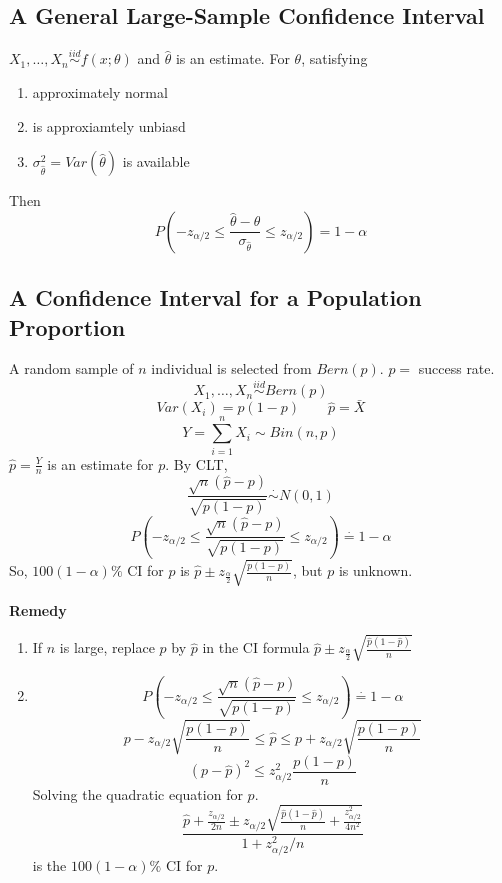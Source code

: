 \subsection{A General Large-Sample Confidence Interval}
$X_1,\dots,X_n \overset{iid}{\sim} f(x;\theta)$ and $\hat{\theta}$ is an estimate.
For $\theta$, satisfying 
\begin{enumerate}
\item approximately normal 
\item is approxiamtely unbiasd
\item $\sigma_{\hat{\theta}}^2=Var(\hat{\theta})$ is available
\end{enumerate}
Then
\[P\left(-z_{\alpha/2} \leq \frac{\hat{\theta}-\theta}{\sigma_{\hat{\theta}}}  \leq  z_{\alpha/2} \right) = 1-\alpha\]

\subsection{A Confidence Interval for a Population Proportion}
\begin{exmp}
A random sample of $n$ individual is selected from $Bern(p)$. $p=$ success rate.
\[X_1,\dots,X_n \overset{iid}{\sim} Bern(p)\]
\[\boxed{Var(X_i)=p(1-p)  \qquad \hat{p}=\bar{X}}\]
\[Y=\sum_{i=1}^n X_i \sim Bin(n,p)\]
$\hat{p}=\frac{Y}{n}$ is an estimate for $p$. By CLT,
\[\frac{\sqrt{n}(\hat{p}-p)}{\sqrt{p(1-p)}} \overset{\cdot}{\sim} N(0,1)\]
\[P\left(-z_{\alpha/2} \leq \frac{\sqrt{n}(\hat{p}-p)}{\sqrt{p(1-p)}}  \leq  z_{\alpha/2} \right) \overset{\cdot}{=} 1-\alpha\]
So, $100(1-\alpha)\%$ CI for $p$ is $\hat{p} \pm  z_{\frac{\alpha}{2}} \sqrt{\frac{p(1-p)}{n}}$, but $p$ is unknown.
\end{exmp}

\textbf{Remedy}
\begin{enumerate}
\item If $n$ is large, replace $p$ by $\hat{p}$ in the CI formula
$\hat{p} \pm  z_{\frac{\alpha}{2}} \sqrt{\frac{\hat{p}(1-\hat{p})}{n}}$
\item 
\[P\left(-z_{\alpha/2} \leq \frac{\sqrt{n}(\hat{p}-p)}{\sqrt{p(1-p)}}  \leq  z_{\alpha/2} \right) \overset{\cdot}{=} 1-\alpha\]
\[p-z_{\alpha/2}\sqrt{\frac{p(1-p)}{n}} \leq\hat{p}\leq p+z_{\alpha/2}\sqrt{\frac{p(1-p)}{n}} \]
\[(p-\hat{p})^2 \leq z_{\alpha/2}^2 \frac{p(1-p)}{n} \]
Solving the quadratic equation for $p$.
\[\frac{\hat{p}+\frac{z_{\alpha/2}}{2n} \pm z_{\alpha/2}\sqrt{\frac{\hat{p}(1-\hat{p})}{n}+\frac{z_{\alpha/2}^2}{4n^2}}}{1+z_{\alpha/2}^2 /n}\]
is the $100(1-\alpha)\%$ CI for $p$.
\end{enumerate}

